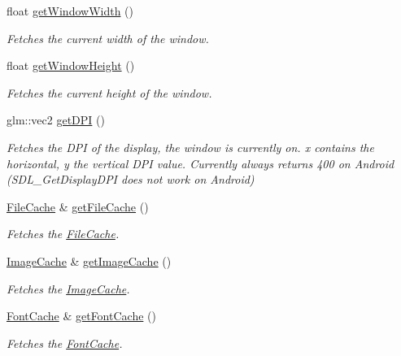 \begin{DoxyCompactItemize}
float \mbox{\hyperlink{classsage_1_1Application_ac67034adebee2a531f1da502b9ac4634}{get\+Window\+Width}} ()
\begin{DoxyCompactList}\small\item\em Fetches the current width of the window. \end{DoxyCompactList}\item 
float \mbox{\hyperlink{classsage_1_1Application_a20be3d592c9d2662051796420d0cd1d8}{get\+Window\+Height}} ()
\begin{DoxyCompactList}\small\item\em Fetches the current height of the window. \end{DoxyCompactList}\item 
glm\+::vec2 \mbox{\hyperlink{classsage_1_1Application_a452bc916f132e0997a02de53d49364d3}{get\+D\+PI}} ()
\begin{DoxyCompactList}\small\item\em Fetches the D\+PI of the display, the window is currently on. x contains the horizontal, y the vertical D\+PI value. Currently always returns 400 on Android (S\+D\+L\+\_\+\+Get\+Display\+D\+PI does not work on Android) \end{DoxyCompactList}\item 
\mbox{\hyperlink{classsage_1_1FileCache}{File\+Cache}} \& \mbox{\hyperlink{classsage_1_1Application_adaacf80b3ecc3efdd4696b869ca3aedd}{get\+File\+Cache}} ()
\begin{DoxyCompactList}\small\item\em Fetches the \mbox{\hyperlink{classsage_1_1FileCache}{File\+Cache}}. \end{DoxyCompactList}\item 
\mbox{\hyperlink{classsage_1_1ImageCache}{Image\+Cache}} \& \mbox{\hyperlink{classsage_1_1Application_a6659ce3fdb899bee814c0628dcbcc423}{get\+Image\+Cache}} ()
\begin{DoxyCompactList}\small\item\em Fetches the \mbox{\hyperlink{classsage_1_1ImageCache}{Image\+Cache}}. \end{DoxyCompactList}\item 
\mbox{\hyperlink{classsage_1_1FontCache}{Font\+Cache}} \& \mbox{\hyperlink{classsage_1_1Application_a325c4ae42e7c7adbb435d68be16f20e7}{get\+Font\+Cache}} ()
\begin{DoxyCompactList}\small\item\em Fetches the \mbox{\hyperlink{classsage_1_1FontCache}{Font\+Cache}}. \end{DoxyCompactList}\item 

\end{DoxyCompactItemize}
